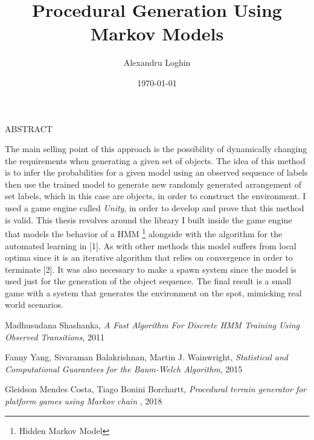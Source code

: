 \documentclass[12pt]{article}
\title{Procedural Generation Using Markov Models}
\date{\today}
\author[1]{Alexandru Loghin}
\newcommand{\smalllineskip}{\baselineskip=15pt}
\renewenvironment{abstract}[0]{\small\rm
        \begin{center}ABSTRACT
        \\ \vspace{8pt}
        \begin{minipage}{5.2in}\smalllineskip
        \hspace{1pc}}{\end{minipage}\end{center}\vspace{-1pt}}
\begin{document}
\maketitle

\begin{abstract}
The main selling point of this approach is the possibility of dynamically changing the requirements when generating a given set of objects. The idea of this method is to infer the probabilities for a given model using an observed sequence of labels then use the trained model to generate new randomly generated arrangement of set labels, which in this case are objects, in order to construct the environment. I used a game engine called \textit{Unity}, in order to develop and prove that this method is valid. This thesis revolves around the library I built inside the game engine that models the behavior of a HMM \footnote{Hidden Markov Model} alongside with the algorithm for the automated learning in [1]. As with other methods this model suffers from local optima since it is an iterative algorithm that relies on convergence in order to terminate [2]. It was also necessary to make a spawn system since the model is used just for the generation of the object sequence. The final result is a small game with a system that generates the environment on the spot, mimicking real world scenarios.
\end{abstract}

\begin{thebibliography}{99}
\small
{} Madhusudana Shashanka, \textit{A Fast Algorithm For Discrete HMM Training Using Observed Transitions}, 2011

 Fanny Yang, Sivaraman Balakrishnan, Martin J. Wainwright, \textit{Statistical and Computational Guarantees for the Baum-Welch Algorithm}, 2015

 Gleidson Mendes Costa, Tiago Bonini Borchartt,
\textit{Procedural terrain generator for platform games using Markov chain} , 2018
\end{thebibliography}
\end{document}

